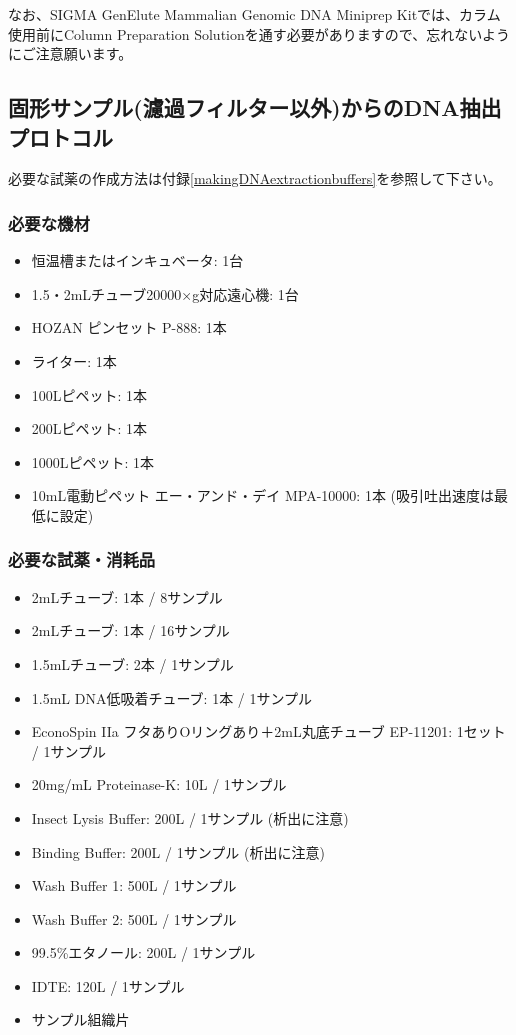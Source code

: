 \documentclass[titlepage,10pt,a4paper,uplatex]{jsbook}
\begin{document}
なお、SIGMA GenElute Mammalian Genomic DNA Miniprep Kitでは、カラム使用前にColumn Preparation Solutionを通す必要がありますので、忘れないようにご注意願います。

\subsection{固形サンプル(濾過フィルター以外)からのDNA抽出プロトコル}

必要な試薬の作成方法は付録\ref{makingDNAextractionbuffers}を参照して下さい。

\subsubsection{必要な機材}
\begin{itemize}
\item 恒温槽またはインキュベータ: 1台
\item 1.5・2mLチューブ20000×g対応遠心機: 1台
\item HOZAN ピンセット P-888: 1本
\item ライター: 1本
\item 100{\textmu}Lピペット: 1本
\item 200{\textmu}Lピペット: 1本
\item 1000{\textmu}Lピペット: 1本
\item 10mL電動ピペット エー・アンド・デイ MPA-10000: 1本 (吸引吐出速度は最低に設定)
\end{itemize}

\subsubsection{必要な試薬・消耗品}
\begin{itemize}
\item 2mLチューブ: 1本 / 8サンプル
\item 2mLチューブ: 1本 / 16サンプル
\item 1.5mLチューブ: 2本 / 1サンプル
\item 1.5mL DNA低吸着チューブ: 1本 / 1サンプル
\item EconoSpin IIa フタありOリングあり＋2mL丸底チューブ EP-11201: 1セット / 1サンプル
\item 20mg/mL Proteinase-K: 10{\textmu}L / 1サンプル
\item Insect Lysis Buffer: 200{\textmu}L / 1サンプル (析出に注意)
\item Binding Buffer: 200{\textmu}L / 1サンプル (析出に注意)
\item Wash Buffer 1: 500{\textmu}L / 1サンプル
\item Wash Buffer 2: 500{\textmu}L / 1サンプル
\item 99.5\%エタノール: 200{\textmu}L / 1サンプル
\item IDTE: 120{\textmu}L / 1サンプル
\item サンプル組織片
\end{itemize}
\end{document}
